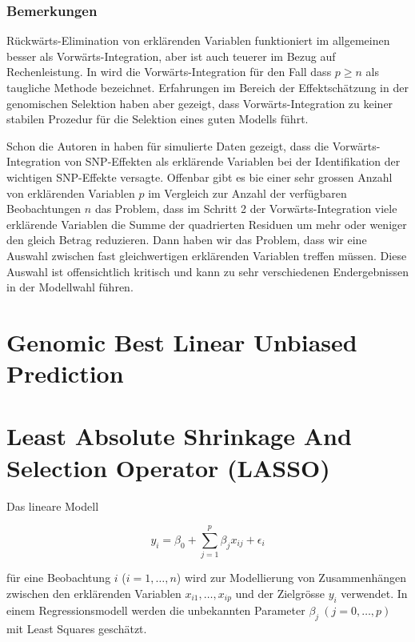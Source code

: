 \documentclass[]{book}
\begin{document}
\subsection{Bemerkungen}\label{bemerkungen}

Rückwärts-Elimination von erklärenden Variablen funktioniert im
allgemeinen besser als Vorwärts-Integration, aber ist auch teuerer im
Bezug auf Rechenleistung. In \citep{BM2014} wird die
Vorwärts-Integration für den Fall dass \(p \ge n\) als taugliche Methode
bezeichnet. Erfahrungen im Bereich der Effektschätzung in der
genomischen Selektion haben aber gezeigt, dass Vorwärts-Integration zu
keiner stabilen Prozedur für die Selektion eines guten Modells führt.

Schon die Autoren in \citep{MHG2001} haben für simulierte Daten gezeigt,
dass die Vorwärts-Integration von SNP-Effekten als erklärende Variablen
bei der Identifikation der wichtigen SNP-Effekte versagte. Offenbar gibt
es bie einer sehr grossen Anzahl von erklärenden Variablen \(p\) im
Vergleich zur Anzahl der verfügbaren Beobachtungen \(n\) das Problem,
dass im Schritt 2 der Vorwärts-Integration viele erklärende Variablen
die Summe der quadrierten Residuen um mehr oder weniger den gleich
Betrag reduzieren. Dann haben wir das Problem, dass wir eine Auswahl
zwischen fast gleichwertigen erklärenden Variablen treffen müssen. Diese
Auswahl ist offensichtlich kritisch und kann zu sehr verschiedenen
Endergebnissen in der Modellwahl führen.

\chapter{Genomic Best Linear Unbiased Prediction}\label{gblup}

\chapter{Least Absolute Shrinkage And Selection Operator
(LASSO)}\label{chpt-lasso}

Das lineare Modell

\begin{equation}
y_i = \beta_0 + \sum_{j=1}^p \beta_jx_{ij} + \epsilon_i
\label{eq:StandardLinMod}
\end{equation}

für eine Beobachtung \(i\) (\(i=1,\ldots,n\)) wird zur Modellierung von
Zusammenhängen zwischen den erklärenden Variablen
\(x_{i1},\ldots,x_{ip}\) und der Zielgrösse \(y_i\) verwendet. In einem
Regressionsmodell werden die unbekannten Parameter
\(\beta_j \ (j=0,\ldots,p)\) mit Least Squares geschätzt.
\end{document}

